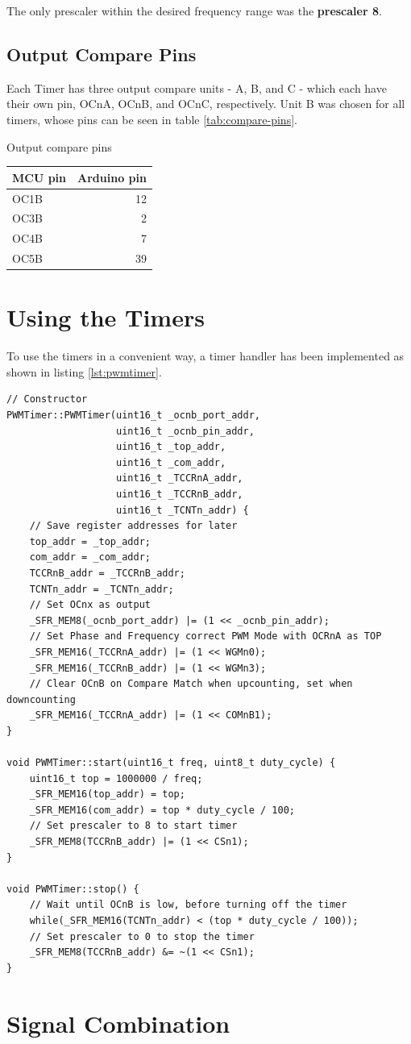 The only prescaler within the desired frequency range was the \textbf{prescaler 8}.

\subsection{Output Compare Pins}

Each Timer has three output compare units - A, B, and C - which each have their own pin, OCnA, OCnB, and OCnC, respectively. Unit B was chosen for all timers, whose pins can be seen in table \ref{tab:compare-pins}.

\begin{margintable}
\centering
\label{tab:compare-pins}
\caption{Output compare pins}
\begin{tabular}{lr}
    \textbf{MCU pin} & \textbf{Arduino pin}\\\midrule
    OC1B & 12\\
    OC3B & 2\\
    OC4B & 7\\
    OC5B & 39
\end{tabular}
\end{margintable}

\section{Using the Timers}

To use the timers in a convenient way, a timer handler has been implemented as shown in listing \ref{lst:pwmtimer}.

\begin{lstlisting}[caption=PWMTimer class, label=lst:pwmtimer]
// Constructor
PWMTimer::PWMTimer(uint16_t _ocnb_port_addr,
				   uint16_t _ocnb_pin_addr,
				   uint16_t _top_addr,
				   uint16_t _com_addr,
				   uint16_t _TCCRnA_addr,
				   uint16_t _TCCRnB_addr, 
				   uint16_t _TCNTn_addr) {
    // Save register addresses for later
    top_addr = _top_addr;
    com_addr = _com_addr;
    TCCRnB_addr = _TCCRnB_addr;
    TCNTn_addr = _TCNTn_addr;
    // Set OCnx as output
    _SFR_MEM8(_ocnb_port_addr) |= (1 << _ocnb_pin_addr);
    // Set Phase and Frequency correct PWM Mode with OCRnA as TOP
    _SFR_MEM16(_TCCRnA_addr) |= (1 << WGMn0);
    _SFR_MEM16(_TCCRnB_addr) |= (1 << WGMn3);
    // Clear OCnB on Compare Match when upcounting, set when downcounting
    _SFR_MEM16(_TCCRnA_addr) |= (1 << COMnB1);
}

void PWMTimer::start(uint16_t freq, uint8_t duty_cycle) {
    uint16_t top = 1000000 / freq;
    _SFR_MEM16(top_addr) = top;
    _SFR_MEM16(com_addr) = top * duty_cycle / 100;
    // Set prescaler to 8 to start timer
    _SFR_MEM8(TCCRnB_addr) |= (1 << CSn1);
}

void PWMTimer::stop() {
    // Wait until OCnB is low, before turning off the timer
    while(_SFR_MEM16(TCNTn_addr) < (top * duty_cycle / 100));
    // Set prescaler to 0 to stop the timer
    _SFR_MEM8(TCCRnB_addr) &= ~(1 << CSn1);
}
\end{lstlisting}

\section{Signal Combination}